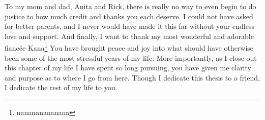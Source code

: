 To my mom and dad, Anita and Rick, there is really no way to even begin to do justice
    to how much credit and thanks you each deserve.
I could not have asked for better parents,
    and I never would have made it this far without your endless love and support.
And finally, I want to thank my most wonderful and adorable
    fianc\'ee Kana\footnote{nanananananana}
You have brought peace and joy into what should have otherwise been
    some of the most stressful years of my life.
More importantly, as I close out this chapter of my life I have spent so long pursuing,
    you have given me clarity and purpose as to where I go from here.
Though I dedicate this thesis to a friend,
    I dedicate the rest of my life to you.
